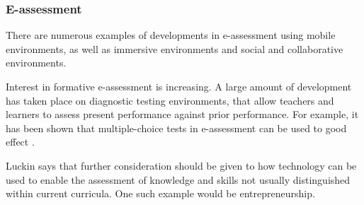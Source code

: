     \subsubsection{E-assessment}
    There are numerous examples of developments in e-assessment using mobile environments, as well as immersive environments and social and collaborative environments.

    Interest in formative e-assessment is increasing. A large amount of development has taken place on diagnostic testing environments, that allow teachers and learners to assess present performance against prior performance. \citep{luckin} For example, it has been shown that multiple-choice tests in e-assessment can be used to good effect \citep{nicol}.


    Luckin says that further consideration should  be given to how technology can be used to enable the assessment of knowledge and skills not usually distinguished within current curricula. \citep{luckin} One such example would be entrepreneurship.

    
